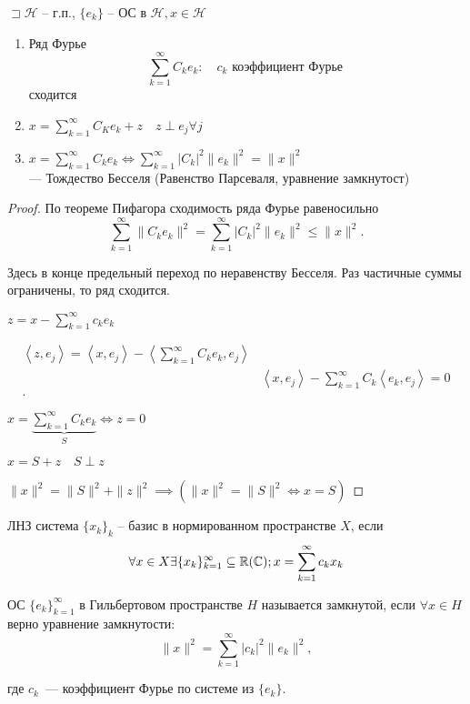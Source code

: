 \begin{theorem}

    $\sqsupset \mathcal{H}$ -- г.п., $\{e_k\}$ -- ОС в $\mathcal{H}, x\in \mathcal{H}$

    \begin{enumerate}
        \item Ряд Фурье \[\sum_{k=1}^{\infty } C_ke_k:\quad c_k \text{ коэффициент Фурье }\]
        сходится
        \item $x = \sum_{k=1}^{\infty } C_K e_k + z\quad z\perp e_j \forall j $
        \item $x = \sum_{k=1}^{\infty } C_k e_k \iff \sum_{k=1}^{\infty } |C_k|^2 \|e_k\|^2 = \|x\|^2 $\\--- Тождество Бесселя (Равенство Парсеваля, уравнение замкнутост)
    \end{enumerate}
\end{theorem}
\begin{proof}
    По теореме Пифагора сходимость ряда Фурье равеносильно
    \[ \sum_{k=1}^{\infty } \|C_k e_k\|^2 = \sum_{k=1}^{\infty } |C_k|^2 \|e_k\|^2 \leqslant \|x\|^2. \]

    Здесь в конце предельный переход по неравенству Бесселя. Раз частичные суммы ограничены, то ряд сходится.

    $z = x - \sum_{k=1}^{\infty }c_ke_k $

    \begin{align*}
        \left<z, e_j \right> = \left<x, e_j \right> - \left<\sum_{k=1}^{\infty } C_ke_k, e_j  \right>\\
        &\left<x, e_j \right> - \sum_{k=1}^{\infty } C_k\left<e_k, e_j  \right> = 0 \\
    .\end{align*}

    $x = \underbrace{\sum_{k=1}^{\infty }C_ke_k}_S \iff z = 0 $

    $x = S + z\quad S\perp z$

    $\|x\|^2 = \|S\|^2 + \|z\|^2 \implies \left( \|x\|^2 = \|S\|^2 \iff x = S \right) $
\end{proof}

\begin{definition}
    ЛНЗ система $\{x_k\}_k$ -- базис в нормированном пространстве $X$, если
    \[\forall x\in X \exists \{x_k\}_{k=1}^{\infty } \subseteq \R(\C); x = \sum_{k=1}^{\infty } c_k x_k \]
\end{definition}

\begin{definition}
    ОС $\{e_k\}_{k=1}^{\infty }$  в Гильбертовом пространстве $H$ называется замкнутой, если $\forall x\in H$ верно уравнение замкнутости:
    \[\|x\|^2 = \sum_{k=1}^{\infty } |c_k|^2 \|e_k\|^2, \]

    где $c_k$~--- коэффициент Фурье по системе из $\{ e_k \}$.
\end{definition}

